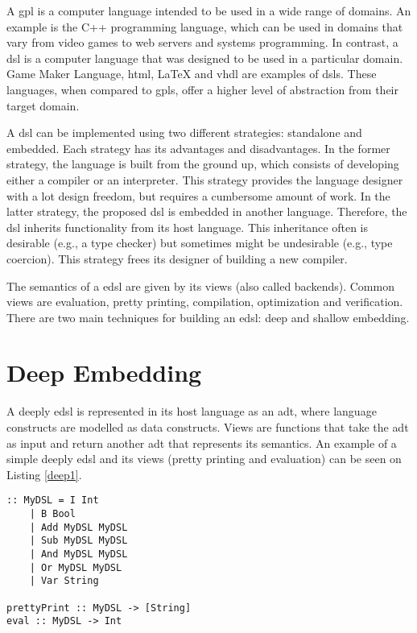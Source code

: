 A \ac{gpl} is a computer language intended to be used in a wide range of domains. An example is the C++ programming language, which can be used in domains that vary from video games to web servers and systems programming. In contrast, a \acf{dsl} is a computer language that was designed to be used in a particular domain. Game Maker Language, \acs{html}, LaTeX and \acs{vhdl} are examples of \acp{dsl}. These languages, when compared to \acp{gpl}, offer a higher level of abstraction from their target domain.

A \ac{dsl} can be implemented using two different strategies: standalone and embedded. Each strategy has its advantages and disadvantages. In the former strategy, the language is built from the ground up, which consists of developing either a compiler or an interpreter. This strategy provides the language designer with a lot design freedom, but requires a cumbersome amount of work. In the latter strategy, the proposed \ac{dsl} is embedded in another language. Therefore, the \ac{dsl} inherits functionality from its host language. This inheritance often is desirable (e.g., a type checker) but sometimes might be undesirable (e.g., type coercion). This strategy frees its designer of building a new compiler.

The semantics of a \acf{edsl} are given by its views (also called backends). Common views are evaluation, pretty printing, compilation, optimization and verification. There are two main techniques for building an \ac{edsl}: deep and shallow embedding.

\section{Deep Embedding}

A deeply \ac{edsl} is represented in its host language as an \ac{adt}, where language constructs are modelled as data constructs. Views are functions that take the \ac{adt} as input and return another \ac{adt} that represents its semantics. An example of a simple deeply \ac{edsl} and its views (pretty printing and evaluation) can be seen on Listing \ref{deep1}.


\begin{lstlisting}[caption=A simple deeply \ac{edsl} and its views,captionpos=b,label=deep1]
:: MyDSL = I Int
    | B Bool
    | Add MyDSL MyDSL
    | Sub MyDSL MyDSL
    | And MyDSL MyDSL
    | Or MyDSL MyDSL
    | Var String
    
prettyPrint :: MyDSL -> [String]
eval :: MyDSL -> Int
\end{lstlisting}


